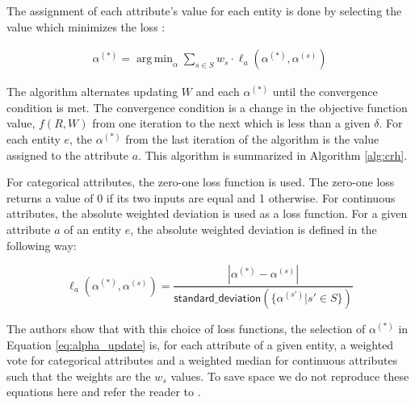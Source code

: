 \documentclass{acm_proc_article-sp}
\DeclareMathOperator*{\argmin}{arg\,min}
\begin{document}
The assignment of each attribute's value for each entity is done by selecting the value which minimizes the loss : 

\begin{align} \label{eq:alpha_update}
\alpha^{(*)} = \argmin_\alpha \sum_{s \in S} w_s \cdot \ell_a(\alpha^{(*)}, \alpha^{(s)})
\end{align}

The algorithm alternates updating $W$ and each $\alpha^{(*)}$ until the convergence condition is met. The convergence condition is a change in the objective function value, $f(R,W)$ from one iteration to the next which is less than a given $\delta$.  For each entity $e$, the $\alpha^{(*)}$ from the last iteration of the algorithm is the value assigned to the attribute $a$. This algorithm is summarized in Algorithm \ref{alg:crh}. 

For categorical attributes, the zero-one loss function is used. The zero-one loss returns a value of 0 if its two inputs are equal and 1 otherwise. For continuous attributes, the absolute weighted deviation is used as a loss function. For a given attribute $a$ of an entity $e$, the absolute weighted deviation is defined in the following way: 

\begin{equation}
\ell_a(\alpha^{(*)}, \alpha^{(s)}) = \frac{|\alpha^{(*)} - \alpha^{(s)}|}{\mathsf{standard\_deviation}(\{\alpha^{(s')} | s' \in S\})}
\end{equation}

The authors show that with this choice of loss functions, the selection of $\alpha^{(*)}$ in Equation \ref{eq:alpha_update} is, for each attribute of a given entity, a weighted vote for categorical attributes and a weighted median for continuous attributes such that the weights are the $w_s$ values. To save space we do not reproduce these equations here and refer the reader to \cite{li:resolving}. 
\end{document}
